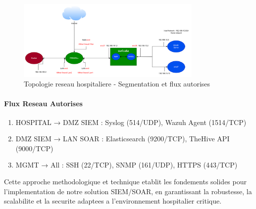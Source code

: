 \begin{figure}[H]
    \centering
    \includegraphics[width=0.8\textwidth]{images/image.png}
    \caption{Topologie reseau hospitaliere - Segmentation et flux autorises}
    \label{fig:topologie_reseau}
\end{figure}

\paragraph{Flux Reseau Autorises}
\begin{enumerate}
    \item HOSPITAL → DMZ SIEM : Syslog (514/UDP), Wazuh Agent (1514/TCP)
    \item DMZ SIEM → LAN SOAR : Elasticsearch (9200/TCP), TheHive API (9000/TCP)
    \item MGMT → All : SSH (22/TCP), SNMP (161/UDP), HTTPS (443/TCP)
\end{enumerate}

Cette approche methodologique et technique etablit les fondements solides pour l'implementation de notre solution SIEM/SOAR, en garantissant la robustesse, la scalabilite et la securite adaptees a l'environnement hospitalier critique.
